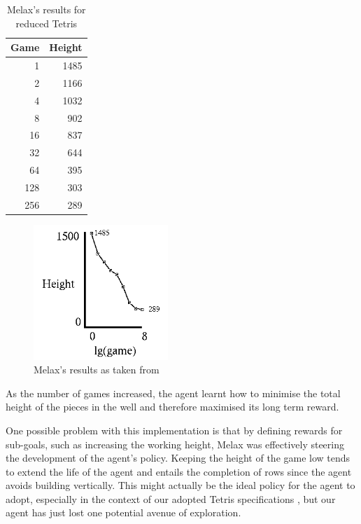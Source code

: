 \documentclass{rucsthesis}
\begin{document}
\begin{table}[h]
\centering
\begin{tabular}{|r|r|}
\hline
Game & Height  \\
\hline
    1 &  1485 \\
     2  & 1166 \\
     4  & 1032 \\
     8  &  902 \\
    16  &  837 \\
    32  &  644 \\
    64  &  395 \\
   128  &  303 \\
   256   & 289 \\
\hline
\end{tabular}
\caption{Melax's results for reduced Tetris}
\label{mresults}
\end{table}

\begin{figure}[h]
\centering
\includegraphics[width=2in]{melaxresults.png}
\caption{Melax's results as taken from \cite{melaxtetris}}
\label{fig:meres}
\end{figure}

As the number of games increased, the agent learnt how to minimise the total height of the pieces in the well and therefore maximised its long term reward.

One possible problem with this implementation is that by defining rewards for sub-goals, such as increasing the working height, Melax was effectively steering the development of the agent's policy. Keeping the height of the game low tends to extend the life of the agent and entails the completion of rows since the agent avoids building vertically. This might actually be the ideal policy for the agent to adopt, especially in the context of our adopted Tetris specifications \citep{tetstand}, but our agent has just lost one potential avenue of exploration. 

\subsubsection{\cite{yaeltetris}}
\end{document}
